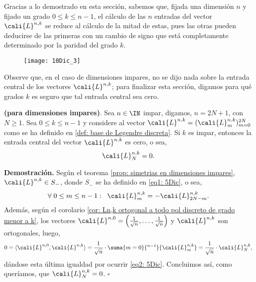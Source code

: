Gracias a lo demostrado en esta sección, sabemos que,
fijada una dimensión $n$ y fijado un grado $0 \leq k \leq n-1$,
el cálculo de las $n$ entradas del vector $\cali{L}^{n,k}$
se reduce al cálculo de la mitad de estas, pues las otras pueden
deducirse de las primeras con un cambio de signo que está completamente
determinado por la paridad del grado $k$.


\begin{figure}[H]
\centering\captionsetup{format = hang}
	\begin{measuredfigure}
		\texttt{[image: 10Dic\_3]} 
		\caption{}
 	\end{measuredfigure}
 \end{figure}

Observe que, en el caso de dimensiones impares, no se dijo nada
sobre la entrada central de los vectores $\cali{L}^{n,k}$;
para finalizar esta sección, digamos para qué grados $k$
es seguro que tal entrada central sea cero.

\begin{teo}
\textbf{(para dimensiones impares)}.
Sea $n \in \IN$ impar, digamos,
$n=2N+1$, con $N \geq 1$. Sea $0 \leq k \leq n-1$ y
considere al vector $\cali{L}^{n,k}=(\cali{L}^{n,k}_{m})_{m=0}^{2N}$
como se ha definido en \eqref{def: base de Legendre discreta}.
Si $k$ es impar, entonces la entrada central del vector
$\cali{L}^{n,k}$ es cero, o sea, 
\[
\cali{L}^{n,k}_{N}=0.
\]
\end{teo}
\noindent
\textbf{Demostración.}
Según el teorema 
\ref{prop: simetrias en dimensiones impares}, 
$\cali{L}^{n,k} \in S_{-}$, 
donde $S_{-}$ se ha definido en \eqref{eq1: 5Dic},
o sea,
\begin{equation}
\label{eq2: 5Dic}
\forall \hspace{0.1cm}
0 \leq m \leq n-1: \hspace{0.2cm} \cali{L}^{n,k}_{m}= 
-\cali{L}^{n,k}_{2N-m}.
\end{equation}
Además, según el corolario
\ref{cor: Ln,k ortogonal a todo pol discreto de grado menor a k},
los vectores
$\cali{L}^{n,0}= \left( \frac{1}{\sqrt{n}},
\ldots , \frac{1}{\sqrt{n}} \right)$ y $\cali{L}^{n,k}$
son ortogonales, luego, 
\[
0= \langle \cali{L}^{n,0}, \cali{L}^{n,k} \rangle
=  \frac{1}{\sqrt{n}} \cdot \suma{m=0}{^{n-1}}{\cali{L}^{n,k}_{m}}
= \frac{1}{\sqrt{n}} \cdot \cali{L}^{n,k}_{N},
\]
dándose esta última igualdad por ocurrir
\eqref{eq2: 5Dic}. Concluimos así, como queríamos, que 
$\cali{L}^{n,k}_{N}=0$.
\null\nobreak\hfill\ensuremath{\square} %
\vspace{0.2cm}
